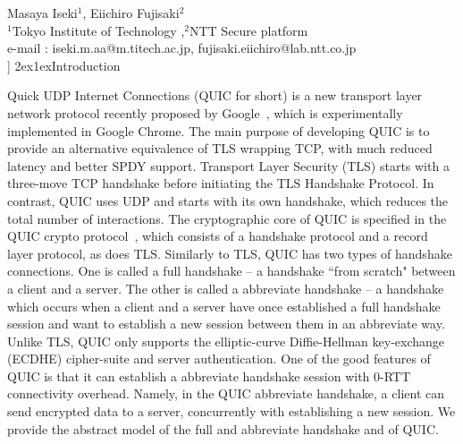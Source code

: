 \documentclass[11pt,a4j]{jarticle}
\makeatletter
\renewcommand{\baselinestretch}{1.3}\selectfont
\def\Title#1{{\Large\bf#1}\\[6pt]}
\def\Author#1{{\normalsize\hspace*{2zw}#1}\\[-4pt]}
\def\Affiliation#1{{\normalsize\hspace*{2zw}#1}\\[-5pt]}
\def\Email#1{\hspace*{2zw}e-mail : #1\\[0pt]}
\renewcommand{\section}{\@startsection{section}{1}{\z@}%
{2ex}{1ex}{\reset@font\large\bfseries}}%
\makeatother
\begin{document}
\twocolumn[
%
\Title{On the security of QUIC}
\Author{Masaya Iseki$^{1}$, Eiichiro Fujisaki$^{2}$}
\Affiliation{$^{1}$Tokyo Institute of Technology ,$^{2}$NTT Secure platform}
\Email{iseki.m.aa@m.titech.ac.jp, fujisaki.eiichiro@lab.ntt.co.jp}
%
]
\renewcommand{\baselinestretch}{0.95}\selectfont
%
%
\section{Introduction}

Quick UDP Internet Connections (QUIC for short)
is a new transport layer network protocol recently proposed by Google~\cite{QUIC},
which is experimentally implemented in Google Chrome.
The main purpose of developing QUIC is to provide an alternative equivalence of TLS wrapping TCP,
with much reduced latency and better SPDY support.
Transport Layer Security (TLS) starts with a three-move TCP handshake
before initiating the TLS Handshake Protocol.
In contrast, QUIC uses UDP and starts with its own handshake,
which reduces the total number of interactions.
The cryptographic core of QUIC is specified in the QUIC crypto protocol~\cite{QUIC:Crypto},
which consists of a handshake protocol and a record layer protocol,
as does TLS.
Similarly to TLS, QUIC has two types of handshake connections.
One is called a full handshake --
a handshake ``from scratch" between a client and a server.
The other is called a abbreviate handshake -- a handshake which occurs when a client and a server have once established a full handshake session
and want to establish a new session between them in an abbreviate way.
Unlike TLS,
QUIC only supports the elliptic-curve Diffie-Hellman key-exchange (ECDHE) cipher-suite and server authentication.
%
One of the good features of QUIC is that it can establish a abbreviate handshake session
with $0$-RTT connectivity overhead.
Namely, in the QUIC abbreviate handshake, a client can
send encrypted data to a server, concurrently with establishing a new session.
We provide the abstract model of the full and abbreviate handshake and of QUIC.
\end{document}
